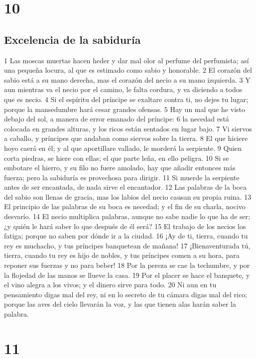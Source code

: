 \chapter{10}

\section*{Excelencia de la sabiduría}

1 Las moscas muertas hacen heder y dar mal olor al perfume del perfumista; así una pequeña locura, al que es estimado como sabio y honorable.
2 El corazón del sabio está a su mano derecha, mas el corazón del necio a su mano izquierda.
3 Y aun mientras va el necio por el camino, le falta cordura, y va diciendo a todos que es necio.
4 Si el espíritu del príncipe se exaltare contra ti, no dejes tu lugar; porque la mansedumbre hará cesar grandes ofensas.
5 Hay un mal que he visto debajo del sol, a manera de error emanado del príncipe:
6 la necedad está colocada en grandes alturas, y los ricos están sentados en lugar bajo.
7 Vi siervos a caballo, y príncipes que andaban como siervos sobre la tierra.
8 El que hiciere hoyo caerá en él; y al que aportillare vallado, le morderá la serpiente.
9 Quien corta piedras, se hiere con ellas; el que parte leña, en ello peligra.
10 Si se embotare el hierro, y su filo no fuere amolado, hay que añadir entonces más fuerza; pero la sabiduría es provechosa para dirigir.
11 Si muerde la serpiente antes de ser encantada, de nada sirve el encantador.
12 Las palabras de la boca del sabio son llenas de gracia, mas los labios del necio causan su propia ruina.
13 El principio de las palabras de su boca es necedad; y el fin de su charla, nocivo desvarío. 
14 El necio multiplica palabras, aunque no sabe nadie lo que ha de ser; ¿y quién le hará saber lo que después de él será?
15 El trabajo de los necios los fatiga; porque no saben por dónde ir a la ciudad.
16 ¡Ay de ti, tierra, cuando tu rey es muchacho, y tus príncipes banquetean de mañana!
17 ¡Bienaventurada tú, tierra, cuando tu rey es hijo de nobles, y tus príncipes comen a su hora, para reponer sus fuerzas y no para beber!
18 Por la pereza se cae la techumbre, y por la flojedad de las manos se llueve la casa.
19 Por el placer se hace el banquete, y el vino alegra a los vivos; y el dinero sirve para todo.
20 Ni aun en tu pensamiento digas mal del rey, ni en lo secreto de tu cámara digas mal del rico; porque las aves del cielo llevarán la voz, y las que tienen alas harán saber la palabra.

\chapter{11}

